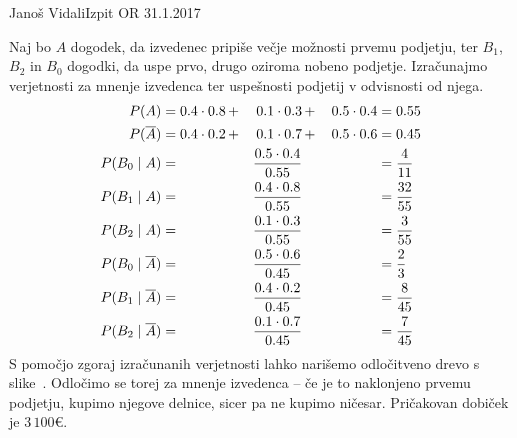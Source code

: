 \begin{naloga}{Janoš Vidali}{Izpit OR 31.1.2017}
\begin{odgovor}
Naj bo $A$ dogodek, da izvedenec pripiše večje možnosti prvemu podjetju,
ter $B_1$, $B_2$ in $B_0$ dogodki,
da uspe prvo, drugo oziroma nobeno podjetje.
Izračunajmo verjetnosti za mnenje izvedenca
ter uspešnosti podjetij v odvisnosti od njega.
\begin{alignat*}{3}
P(A) &= 0.4 \cdot 0.8 \,+&\, 0.1 \cdot 0.3 &\,+\,& 0.5 \cdot 0.4 &= 0.55 \\
P(\overline{A}) &= 0.4 \cdot 0.2 \,+&\, 0.1 \cdot 0.7 &\,+\,& 0.5 \cdot 0.6 &= 0.45 \\
P(B_0 \;|\; A) &=&{} {0.5 \cdot 0.4 \over 0.55} &&&= {4 \over 11} \\
P(B_1 \;|\; A) &=&{} {0.4 \cdot 0.8 \over 0.55} &&&= {32 \over 55} \\
P(B_2 \;|\; A) &=&{} {0.1 \cdot 0.3 \over 0.55} &&&= {3 \over 55} \\
P(B_0 \;|\; \overline{A}) &=&{} {0.5 \cdot 0.6 \over 0.45} &&&= {2 \over 3} \\
P(B_1 \;|\; \overline{A}) &=&{} {0.4 \cdot 0.2 \over 0.45} &&&= {8 \over 45} \\
P(B_2 \;|\; \overline{A}) &=&{} {0.1 \cdot 0.7 \over 0.45} &&&= {7 \over 45}
\end{alignat*}
S pomočjo zgoraj izračunanih verjetnosti
lahko narišemo odločitveno drevo s slike~\fig.
Odločimo se torej za mnenje izvedenca
-- če je to naklonjeno prvemu podjetju, kupimo njegove delnice,
sicer pa ne kupimo ničesar.
Pričakovan dobiček je $3\,100 €$.

\begin{slika}
\makebox[\textwidth][c]{
\pgfslika
}
\end{slika}
\end{odgovor}
\end{naloga}
